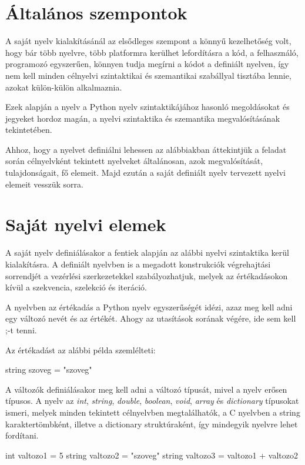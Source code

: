 
\section{Általános szempontok}

A saját nyelv kialakításánál az elsődleges szempont a könnyű kezelhetőség volt, hogy bár több nyelvre, több platformra kerülhet lefordításra a kód, a felhasználó, programozó egyszerűen, könnyen tudja megírni a kódot a definiált nyelven, így nem kell minden célnyelvi szintaktikai és szemantikai szabállyal tisztába lennie, azokat külön-külön alkalmaznia.

Ezek alapján a nyelv a Python nyelv szintaktikájához hasonló megoldásokat és jegyeket hordoz magán, a nyelvi szintaktika és szemantika megvalósításának tekintetében.

Ahhoz, hogy a nyelvet definiálni lehessen az alábbiakban áttekintjük a feladat során célnyelvként tekintett nyelveket általánosan, azok megvalósítását, tulajdonságait, fő elemeit. Majd ezután a saját definiált nyelv tervezett nyelvi elemeit vesszük sorra.

\section{Saját nyelvi elemek}

A saját nyelv definiálásakor a fentiek alapján az alábbi nyelvi szintaktika kerül kialakításra.
A definiált nyelvben is a megadott konstrukciók végrehajtási sorrendjét a vezérlési szerkezetekkel szabályozhatjuk, melyek az értékadásokon kívül a szekvencia, szelekció és iteráció.

A nyelvben az értékadás a Python nyelv egyszerűségét idézi, azaz meg kell adni egy változó nevét és az értékét. Ahogy az utasítások sorának végére, ide sem kell ;-t tenni.

Az értékadást az alábbi példa szemlélteti:
\begin{cpp}
string szoveg = "szoveg"
\end{cpp}

A változók definiálásakor meg kell adni a változó típusát, mivel a nyelv erősen típusos. A nyelv az \textit{int}, \textit{string}, \textit{double}, \textit{boolean}, \textit{void}, \textit{array} és \textit{dictionary} típusokat ismeri, melyek minden tekintett célnyelvben megtalálhatók, a C nyelvben a string karaktertömbként, illetve a dictionary struktúraként, így mindegyik nyelvre lehet fordítani.
\begin{cpp}
int valtozo1 = 5
string valtozo2 = "szoveg"
string valtozo3 = valtozo1 + valtozo2
\end{cpp}

